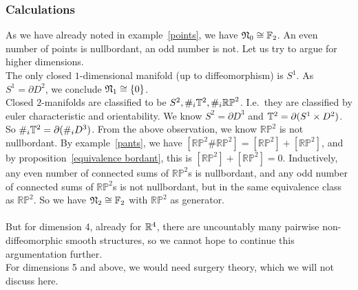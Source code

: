 \documentclass[a4paper,11pt]{article}
\begin{document}
\subsubsection{Calculations}


As we have already noted in example\ \ref{points}, we have \(\mathfrak{N}_0\cong\mathbb{F}_2\). An even number of points is nullbordant, an odd number is not. Let us try to argue for higher dimensions.\\
The only closed \(1\)-dimensional manifold (up to diffeomorphism) is \(S^1\). As \(S^1=\partial D^2\), we conclude \(\mathfrak{N}_1\cong \{0\}\).\\
Closed \(2\)-manifolds are classified to be \(S^2, \#_i\mathbb{T}^2, \#_i\mathbb{RP}^2\). I.e.\ they are classified by euler characteristic and orientability. We know \(S^2=\partial D^3\) and \(\mathbb{T}^2=\partial (S^1\times D^2)\). So \(\#_i\mathbb{T}^2=\partial(\#_i D^3)\). From the above observation, we know \(\mathbb{RP}^2\) is not nullbordant. 
By example\ \ref{pants}, we have \([\mathbb{RP}^2\#\mathbb{RP}^2]=[\mathbb{RP}^2]+[\mathbb{RP}^2]\), and by proposition\ \ref{equivalence bordant}, this is \([\mathbb{RP}^2]+[\mathbb{RP}^2]=0\). Inductively, any even number of connected sums of \(\mathbb{RP}^2\)s is nullbordant, and any odd number of connected sums of \(\mathbb{RP}^2\)s is not nullbordant, but in the same equivalence class as \(\mathbb{RP}^2\). So we have \(\mathfrak{N}_2\cong\mathbb{F}_2\) with \(\mathbb{RP}^2\) as generator.\\
\\
But for dimension 4, already for \(\mathbb{R}^4\), there are uncountably many pairwise non-diffeomorphic smooth structures, so we cannot hope to continue this argumentation further.\\
For dimensions 5 and above, we would need surgery theory, which we will not discuss here.
\end{document}

